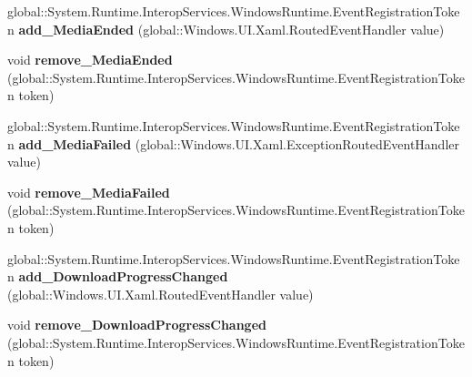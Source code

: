 \begin{DoxyCompactItemize}
global\+::\+System.\+Runtime.\+Interop\+Services.\+Windows\+Runtime.\+Event\+Registration\+Token {\bfseries add\+\_\+\+Media\+Ended} (global\+::\+Windows.\+U\+I.\+Xaml.\+Routed\+Event\+Handler value)
\item 
\mbox{\label{interface_windows_1_1_u_i_1_1_xaml_1_1_controls_1_1_i_media_element_ae99093952bc4b7f856129d782cea9237}} 
void {\bfseries remove\+\_\+\+Media\+Ended} (global\+::\+System.\+Runtime.\+Interop\+Services.\+Windows\+Runtime.\+Event\+Registration\+Token token)
\item 
\mbox{\label{interface_windows_1_1_u_i_1_1_xaml_1_1_controls_1_1_i_media_element_ad3294027d9bad7858a991bb3a8b07ef8}} 
global\+::\+System.\+Runtime.\+Interop\+Services.\+Windows\+Runtime.\+Event\+Registration\+Token {\bfseries add\+\_\+\+Media\+Failed} (global\+::\+Windows.\+U\+I.\+Xaml.\+Exception\+Routed\+Event\+Handler value)
\item 
\mbox{\label{interface_windows_1_1_u_i_1_1_xaml_1_1_controls_1_1_i_media_element_afb81febce56b850ab6cff6148327aaea}} 
void {\bfseries remove\+\_\+\+Media\+Failed} (global\+::\+System.\+Runtime.\+Interop\+Services.\+Windows\+Runtime.\+Event\+Registration\+Token token)
\item 
\mbox{\label{interface_windows_1_1_u_i_1_1_xaml_1_1_controls_1_1_i_media_element_a57e937eee241a696cb1b801e5d5d4291}} 
global\+::\+System.\+Runtime.\+Interop\+Services.\+Windows\+Runtime.\+Event\+Registration\+Token {\bfseries add\+\_\+\+Download\+Progress\+Changed} (global\+::\+Windows.\+U\+I.\+Xaml.\+Routed\+Event\+Handler value)
\item 
\mbox{\label{interface_windows_1_1_u_i_1_1_xaml_1_1_controls_1_1_i_media_element_a8aaeaafe6a46fee402a829a599d1aae3}} 
void {\bfseries remove\+\_\+\+Download\+Progress\+Changed} (global\+::\+System.\+Runtime.\+Interop\+Services.\+Windows\+Runtime.\+Event\+Registration\+Token token)
\item 
\mbox{\label{interface_windows_1_1_u_i_1_1_xaml_1_1_controls_1_1_i_media_element_a84b55fbe2bab2bbb0288457d0c16c52c}} 

\end{DoxyCompactItemize}
